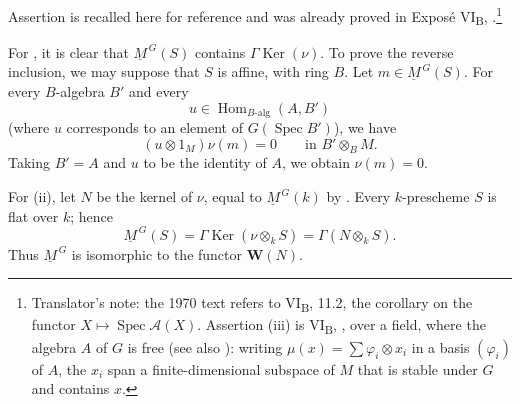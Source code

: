 Assertion  is recalled here for reference and was already proved
in Exposé VI\textsubscript{B}, .\footnote{Translator's note: the 1970 text
refers to VI\textsubscript{B}, 11.2, the corollary on the functor
\(X\mapsto\operatorname{Spec}\mathcal A(X)\). Assertion (iii) is VI\textsubscript{B},
, over a field, where the algebra \(A\) of \(G\) is free (see also
): writing \(\mu(x)=\sum\varphi_i\otimes x_i\) in a basis
\((\varphi_i)\) of \(A\), the \(x_i\) span a finite-dimensional subspace of \(M\) that is stable under
\(G\) and contains \(x\).}

For , it is clear that \(\underline M^{\,G}(S)\) contains
\(\Gamma\operatorname{Ker}(\nu)\).  To prove the reverse inclusion, we
may suppose that \(S\) is affine, with ring \(B\).  Let
\(m\in\underline M^{\,G}(S)\).  For every \(B\)-algebra \(B'\) and
every
\[
  u\in\operatorname{Hom}_{B\text{-alg}}(A,B')
\]
(where \(u\) corresponds to an element of
\(G(\operatorname{Spec}B')\)), we have
\[
  (u\otimes1_M)\nu(m)=0
  \qquad\text{in }B'\otimes_BM.
\]
Taking \(B'=A\) and \(u\) to be the identity of \(A\), we obtain
\(\nu(m)=0\).

For (ii), let \(N\) be the kernel of \(\nu\), equal to
\(\underline M^{\,G}(k)\) by .  Every \(k\)-prescheme \(S\) is flat
over \(k\); hence
\[
  \underline M^{\,G}(S)
  =\Gamma\operatorname{Ker}(\nu\otimes_k S)
  =\Gamma(N\otimes_k S).
\]
Thus \(\underline M^{\,G}\) is isomorphic to the functor
\(\mathbf W(N)\).

